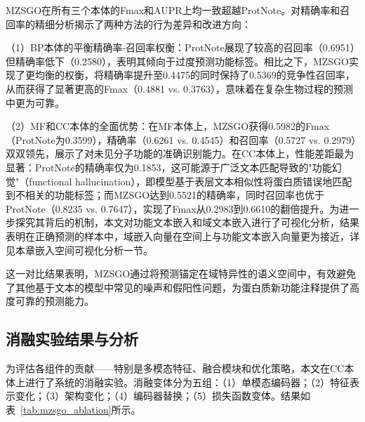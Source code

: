 MZSGO在所有三个本体的Fmax和AUPR上均一致超越ProtNote。对精确率和召回率的精细分析揭示了两种方法的行为差异和改进方向：

（1）BP本体的平衡精确率-召回率权衡：ProtNote展现了较高的召回率（0.6951）但精确率低下（0.2580），表明其倾向于过度预测功能标签。相比之下，MZSGO实现了更均衡的权衡，将精确率提升至0.4475的同时保持了0.5369的竞争性召回率，从而获得了显著更高的Fmax（0.4881 vs. 0.3763），意味着在复杂生物过程的预测中更为可靠。

（2）MF和CC本体的全面优势：在MF本体上，MZSGO获得0.5982的Fmax（ProtNote为0.3599），精确率（0.6261 vs. 0.4545）和召回率（0.5727 vs. 0.2979）双双领先，展示了对未见分子功能的准确识别能力。在CC本体上，性能差距最为显著：ProtNote的精确率仅为0.1853，这可能源于广泛文本匹配导致的"功能幻觉"（functional hallucination），即模型基于表层文本相似性将蛋白质错误地匹配到不相关的功能标签；而MZSGO达到0.5521的精确率，同时召回率也优于ProtNote（0.8235 vs. 0.7647），实现了Fmax从0.2983到0.6610的翻倍提升。为进一步探究其背后的机制，本文对功能文本嵌入和域文本嵌入进行了可视化分析，结果表明在正确预测的样本中，域嵌入向量在空间上与功能文本嵌入向量更为接近，详见本章嵌入空间可视化分析一节。

这一对比结果表明，MZSGO通过将预测锚定在域特异性的语义空间中，有效避免了其他基于文本的模型中常见的噪声和假阳性问题，为蛋白质新功能注释提供了高度可靠的预测能力。

\subsection{消融实验结果与分析}

为评估各组件的贡献——特别是多模态特征、融合模块和优化策略，本文在CC本体上进行了系统的消融实验。消融变体分为五组：（1）单模态编码器；（2）特征表示变化；（3）架构变化；（4）编码器替换；（5）损失函数变体。结果如表~\ref{tab:mzsgo_ablation}所示。

